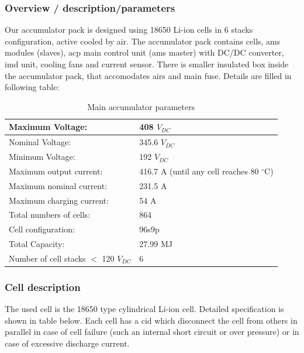 \subsubsection{Overview / description/parameters}
Our accumulator pack is designed using 18650 Li-ion cells in 6 stacks configuration, active cooled by air. The accumulator pack contains cells, \gls{ams} modules (slaves), \gls{acp} main control unit (\gls{ams} master) with DC/DC converter, \gls{imd} unit, cooling fans and current sensor. There is smaller insulated box inside the accumulator pack, that accomodates \glspl{air} and main fuse.
Details are filled in following table:

\begin{table}[H]
	\centering
	\caption{Main accumulator parameters}
	\begin{tabu}{|X|X|}
		\hline
		Maximum Voltage: & 408 $V_{DC}$ \\
		\hline
		Nominal Voltage: & 345.6 $V_{DC}$ \\
		\hline
		Minimum Voltage: & 192 $V_{DC}$ \\
		\hline
		Maximum output current: & 416.7 A (until any cell reaches 80 $^\circ$C) \\
		\hline
		Maximum nominal current: & 231.5 A \\
		\hline
		Maximum charging current: & 54 A \\
		\hline
		Total numbers of cells: & 864 \\
		\hline
		Cell configuration: & 96s9p \\
		\hline
		Total Capacity: & 27.99 MJ \\
		\hline
		Number of cell stacks $<$ 120 $V_{DC}$ & 6 \\
		\hline
	\end{tabu}%
	\label{tab:acc-main}%
\end{table}%

\subsubsection{Cell description}

The used cell is the 18650 type cylindrical Li-ion cell. Detailed specification is shown in table below. Each cell has a \gls{cid} which disconnect the cell from others in parallel in case of cell failure (such an internal short circuit or over pressure) or in case of excessive discharge current. 

